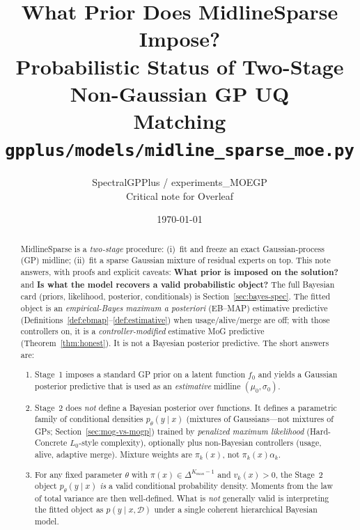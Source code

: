\documentclass[11pt,a4paper]{article}
\title{\textbf{What Prior Does MidlineSparse Impose?}\\[0.35em]
\large Probabilistic Status of Two-Stage Non-Gaussian GP UQ\\[0.25em]
\normalsize Matching \texttt{gpplus/models/midline\_sparse\_moe.py}}
\author{SpectralGPPlus / experiments\_MOEGP\\
Critical note for Overleaf}
\date{\today}
\theoremstyle{plain}
\theoremstyle{definition}
\theoremstyle{remark}
\newcommand{\D}{\mathcal{D}}
\newcommand{\tht}{\theta}
\newcommand{\Kmax}{K_{\max}}
\newcommand{\EBMAP}{EB--MAP}
\newcommand{\simplex}{\Delta}
\begin{document}
\maketitle

\begin{abstract}
MidlineSparse is a \emph{two-stage} procedure: (i)~fit and freeze an exact Gaussian-process (GP)
midline; (ii)~fit a sparse Gaussian mixture of residual experts on top.
This note answers, with proofs and explicit caveats: \textbf{What prior is imposed on the
solution?} and \textbf{Is what the model recovers a valid probabilistic object?}
The full Bayesian card (priors, likelihood, posterior, conditionals) is
Section~\ref{sec:bayes-spec}.
The fitted object is an
\emph{empirical-Bayes maximum a posteriori} (\EBMAP) estimative predictive
(Definitions~\ref{def:ebmap}--\ref{def:estimative}) when usage/alive/merge are off;
with those controllers on, it is a \emph{controller-modified} estimative MoG predictive
(Theorem~\ref{thm:honest}).
It is not a Bayesian posterior predictive.
The short answers are:
\begin{enumerate}[leftmargin=1.4em,itemsep=0.2em]
  \item Stage~1 imposes a standard GP prior on a latent function \(f_0\) and yields a
        Gaussian posterior predictive that is used as an \emph{estimative} midline
        \((\mu_0,\sigma_0)\).
  \item Stage~2 does \emph{not} define a Bayesian posterior over functions. It defines a
        parametric family of conditional densities \(p_\tht(y\mid x)\) (mixtures of
        Gaussians---not mixtures of GPs; Section~\ref{sec:mog-vs-mogp})
        trained by \emph{penalized maximum likelihood} (Hard-Concrete \(L_0\)-style
        complexity), optionally plus non-Bayesian controllers (usage, alive, adaptive merge).
        Mixture weights are \(\pi_k(x)\), not \(\pi_k(x)\alpha_k\).
  \item For any fixed parameter \(\tht\) with \(\pi(x)\in\simplex^{\Kmax-1}\) and
        \(v_k(x)>0\), the Stage~2 object \(p_\tht(y\mid x)\) \emph{is} a valid
        conditional probability density. Moments from the law of total variance are then
        well-defined. What is \emph{not} generally valid is interpreting the fitted object
        as \(p(y\mid x,\D)\) under a single coherent hierarchical Bayesian model.
\end{enumerate}
\end{abstract}

\tableofcontents
\newpage
\end{document}
